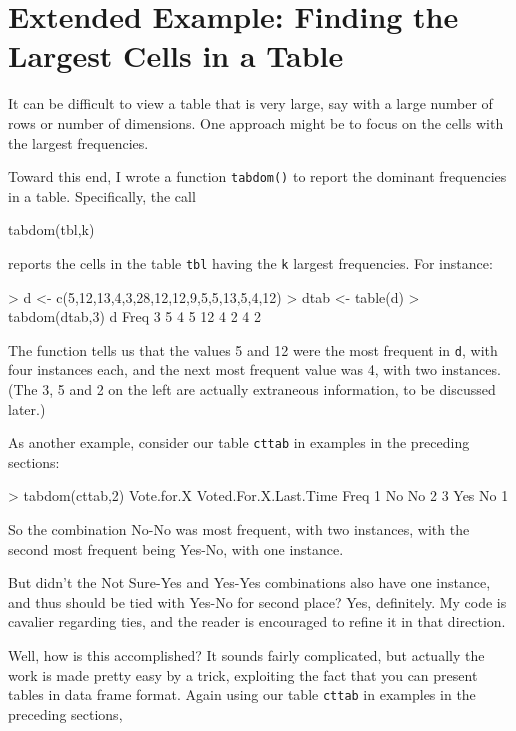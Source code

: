 \section{Extended Example:  Finding the Largest Cells in a Table}

It can be difficult to view a table that is very large, say with a large
number of rows or number of dimensions.  One approach might be to focus
on the cells with the largest frequencies.  

Toward this end, I wrote a function {\tt tabdom()} to report the
dominant frequencies in a table.  Specifically, the call

\begin{Code}
tabdom(tbl,k)
\end{Code}

\noindent
reports the cells in the table {\tt tbl} having the {\tt k} largest 
frequencies.  For instance:

\begin{Code}
> d <- c(5,12,13,4,3,28,12,12,9,5,5,13,5,4,12)
> dtab <- table(d)
> tabdom(dtab,3)
   d Freq
3  5    4
5 12    4
2  4    2
\end{Code}

\noindent
The function tells us that the values 5 and 12 were the most frequent in
{\tt d}, with four instances each, and the next most frequent value was
4, with two instances.  (The 3, 5 and 2 on the left are actually extraneous
information, to be discussed later.)

As another example, consider our table {\tt cttab} in examples in the
preceding sections:

\begin{Code}
> tabdom(cttab,2)
  Vote.for.X Voted.For.X.Last.Time Freq
1         No                    No    2
3        Yes                    No    1
\end{Code}

\noindent
So the combination No-No was most frequent, with two instances, with the
second most frequent being Yes-No, with one instance.

But didn't the Not Sure-Yes and Yes-Yes combinations also have one
instance, and thus should be tied with Yes-No for second place?  Yes,
definitely.  My code is cavalier regarding ties, and the reader is
encouraged to refine it in that direction.

Well, how is this accomplished?  It sounds fairly complicated, but
actually the work is made pretty easy by a trick, exploiting the fact
that you can present tables in data frame format.  Again using our table
{\tt cttab} in examples in the preceding sections,

